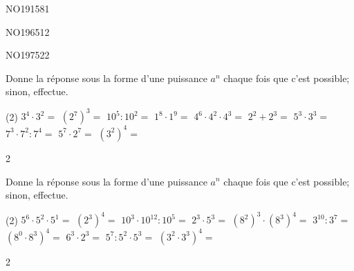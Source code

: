 \documentclass[a4paper,11pt]{report}
\begin{document}
\begin{exof}{NO191}{58}{1} %
\end{exof}




\begin{exol}{NO196}{51}{2} %
\end{exol}
\begin{exol}{NO197}{52}{2} %
\end{exol}

\begin{exop}{%
Donne la réponse sous la forme d'une puissance $a^n$ chaque fois que c'est possible; sinon, effectue.
\begin{tasks}(2)
    \task $3^4\cdot3^2=$ \hrulefill \quad
    \task ${(2^7)}^3=$ \hrulefill \quad
    \task $10^5:10^2=$ \hrulefill \quad
    \task $1^8\cdot1^9=$ \hrulefill \quad
    \task $4^6\cdot4^2\cdot4^3=$ \hrulefill \quad
    \task $2^2+2^3=$ \hrulefill \quad
    \task $5^3\cdot3^3=$ \hrulefill \quad
    \task $7^3\cdot7^2:7^4=$ \hrulefill \quad
    \task $5^7\cdot2^7=$ \hrulefill \quad
    \task ${(3^2)}^4=$ \hrulefill \quad
\end{tasks}
}{2}    
\end{exop}

\begin{exop}{%
Donne la réponse sous la forme d'une puissance $a^n$ chaque fois que c'est possible; sinon, effectue.
\begin{tasks}(2)
    \task $5^6\cdot5^2\cdot5^1=$ \hrulefill \quad
    \task ${(2^3)}^4=$ \hrulefill \quad
    \task $10^3\cdot10^{12}:10^5=$ \hrulefill \quad
    \task $2^3\cdot5^3 =$ \hrulefill \quad
    \task ${(8^2)}^3\cdot{(8^3)}^4 =$ \hrulefill \quad
    \task $3^{10}:3^7 =$ \hrulefill \quad
    \task ${(8^0\cdot8^3)}^4 =$ \hrulefill \quad
    \task $6^3\cdot2^3 =$ \hrulefill \quad
    \task $5^7:5^2\cdot5^3 =$ \hrulefill \quad
    \task ${(3^2\cdot3^3)}^4 =$ \hrulefill \quad
\end{tasks}
}{2}    
\end{exop}
\end{document}
